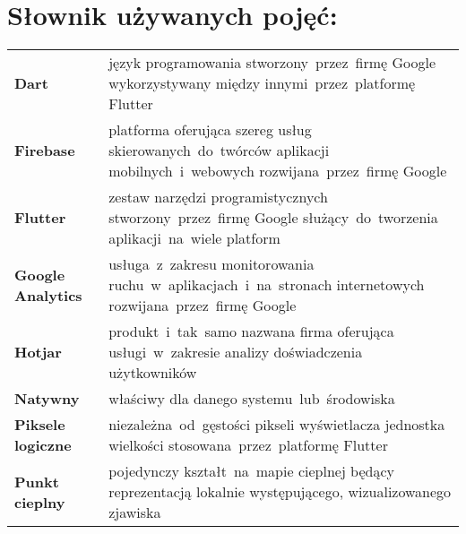 \section*{Słownik używanych pojęć:}

\begin{table}[H]
\begin{tabularx}{\textwidth}{ m{2.8cm} X }
	\textbf{Dart} \dotfill & język programowania stworzony~przez~firmę Google wykorzystywany między innymi~przez~platformę Flutter \\
	\textbf{Firebase} \dotfill & platforma oferująca szereg usług skierowanych~do~twórców aplikacji mobilnych~i~webowych rozwijana~przez~firmę Google \\
	\textbf{Flutter} \dotfill & zestaw narzędzi programistycznych stworzony~przez~firmę Google służący~do~tworzenia aplikacji~na~wiele platform \\
	\textbf{Google Analytics} \dotfill & usługa~z~zakresu monitorowania ruchu~w~aplikacjach~i~na~stronach internetowych rozwijana~przez~firmę Google \\
	\textbf{Hotjar} \dotfill & produkt~i~tak~samo nazwana firma oferująca usługi~w~zakresie analizy doświadczenia użytkowników \\
	\textbf{Natywny} \dotfill & właściwy dla danego systemu~lub~środowiska \\
	\textbf{Piksele logiczne} \dotfill & niezależna~od~gęstości pikseli wyświetlacza jednostka wielkości stosowana~przez~platformę Flutter \\
	\textbf{Punkt cieplny} \dotfill & pojedynczy kształt~na~mapie cieplnej będący reprezentacją lokalnie występującego, wizualizowanego zjawiska \\
\end{tabularx}
\end{table}
